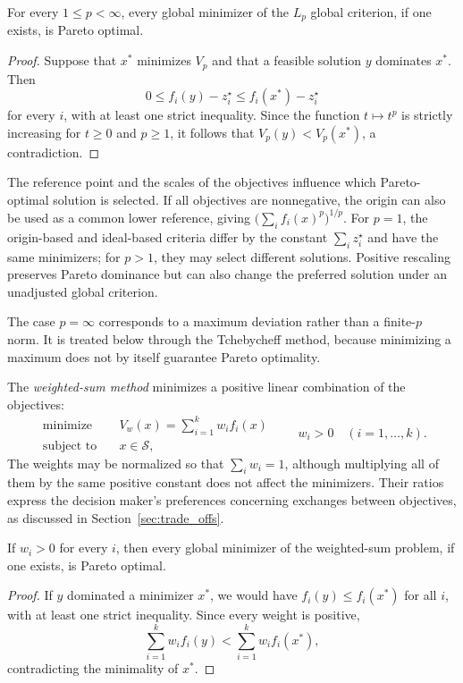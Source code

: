 \begin{proposition}
\label{prop:global_criterion_pareto_optimal}
For every $1\leq p<\infty$, every global minimizer of the $L_p$ global criterion, if one exists, is Pareto optimal.
\end{proposition}
\begin{proof}
Suppose that $x^*$ minimizes $V_p$ and that a feasible solution $y$ dominates $x^*$. Then
\[
0\leq f_i(y)-z_i^{\star}\leq f_i(x^*)-z_i^{\star}
\]
for every $i$, with at least one strict inequality. Since the function $t\mapsto t^p$ is strictly increasing for $t\geq0$ and $p\geq1$, it follows that $V_p(y)<V_p(x^*)$, a contradiction.
\end{proof}

The reference point and the scales of the objectives influence which Pareto-optimal solution is selected. If all objectives are nonnegative, the origin can also be used as a common lower reference, giving $\bigl(\sum_i f_i(x)^p\bigr)^{1/p}$. For $p=1$, the origin-based and ideal-based criteria differ by the constant $\sum_i z_i^{\star}$ and have the same minimizers; for $p>1$, they may select different solutions. Positive rescaling preserves Pareto dominance but can also change the preferred solution under an unadjusted global criterion.

The case $p=\infty$ corresponds to a maximum deviation rather than a finite-$p$ norm. It is treated below through the Tchebycheff method, because minimizing a maximum does not by itself guarantee Pareto optimality.

The \emph{weighted-sum method} minimizes a positive linear combination of the objectives:
\[
\begin{aligned}
\text{minimize}\quad & V_w(x)=\sum_{i=1}^{k}w_i f_i(x)\\
\text{subject to}\quad & x\in\mathcal{S},
\end{aligned}
\qquad w_i>0\quad(i=1,\ldots,k).
\]
The weights may be normalized so that $\sum_i w_i=1$, although multiplying all of them by the same positive constant does not affect the minimizers. Their ratios express the decision maker's preferences concerning exchanges between objectives, as discussed in Section~\ref{sec:trade_offs}.

\begin{proposition}
\label{prop:weighted_method_pareto_optimal}
If $w_i>0$ for every $i$, then every global minimizer of the weighted-sum problem, if one exists, is Pareto optimal.
\end{proposition}
\begin{proof}
If $y$ dominated a minimizer $x^*$, we would have $f_i(y)\leq f_i(x^*)$ for all $i$, with at least one strict inequality. Since every weight is positive,
\[
\sum_{i=1}^{k}w_i f_i(y)<\sum_{i=1}^{k}w_i f_i(x^*),
\]
contradicting the minimality of $x^*$.
\end{proof}


